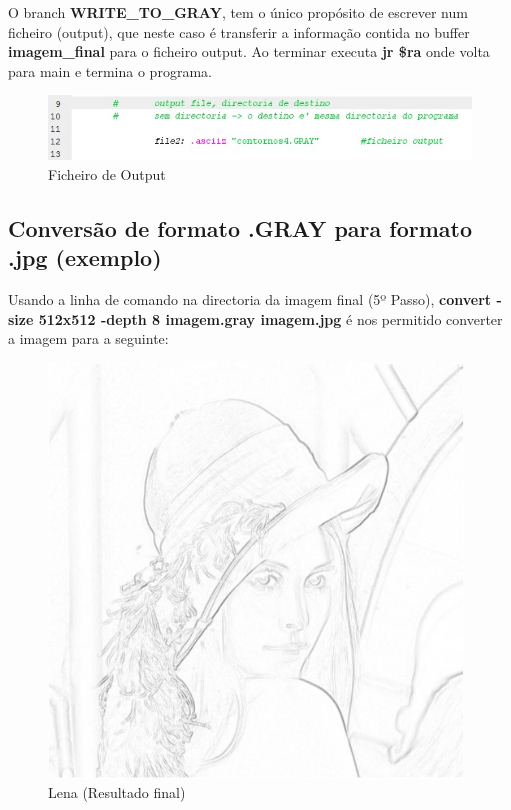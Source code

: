 \documentclass[a4paper,11pt]{article}
\begin{document}
\newline
\newline
\indent O branch {\bf WRITE\_TO\_GRAY}, tem o único propósito de escrever num ficheiro (output), que neste caso é transferir a informação contida no buffer {\bf imagem\_final} para o ficheiro output. Ao terminar executa {\bf jr \$ra} onde volta para main e termina o programa.

\begin{figure}[ht!]
\centering
\includegraphics[width=150mm]{imagem4}
\caption{Ficheiro de Output}
\label{overflow}
\end{figure}


\newpage
\subsection{Conversão de formato .GRAY para formato .jpg (exemplo)}

Usando a linha de comando na directoria da imagem final (5º Passo), {\bf convert -size 512x512 -depth 8 imagem.gray imagem.jpg} é nos permitido converter a imagem para a seguinte:

\begin{figure}[ht!]
\centering
\includegraphics[width=110mm]{Lena(final)}
\caption{Lena (Resultado final)}
\label{overflow}
\end{figure}
\end{document}
